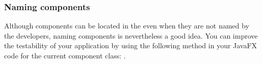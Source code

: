 
\subsubsection{Naming components}
Although  components  can be located in the \gdaut{} even when they are not named by the developers, naming components is nevertheless a good idea.  You can improve the testability of your application by using the following method in your JavaFX code for the current component class: . 

